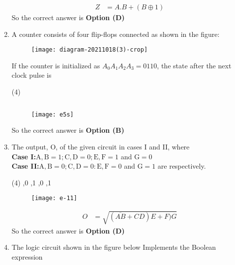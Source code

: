 \begin{enumerate}
\begin{answer}
\begin{align*}
Z&=A . B+(B \oplus 1)
\end{align*}
So the correct answer is \textbf{Option (D)}
\end{answer}
	\item A counter consists of four flip-flops connected as shown in the figure:\\
	\begin{figure}[H]
		\centering
		\texttt{[image: diagram-20211018(3)-crop]}
	\end{figure}
	If the counter is initialized as $A_{0} A_{1} A_{2} A_{3}=0110$, the state after the next clock pulse is
	{}
\begin{tasks}(4)
\end{tasks}
\begin{answer}$\left. \right. $
\begin{figure}[H]
	\centering
	\texttt{[image: e5s]}
\end{figure}
So the correct answer is \textbf{Option (B)}
\end{answer}
	\item The output, $\mathrm{O}$, of the given circuit in cases I and II, where\\
	\textbf{Case I:}\quad $\mathrm{A}, \mathrm{B}=1 ; \mathrm{C}, \mathrm{D}=0 ; \mathrm{E}, \mathrm{F}=1$ and $\mathrm{G}=0$\\
	\textbf{Case II:}\quad $\mathrm{A}, \mathrm{B}=0 ; \mathrm{C}, \mathrm{D}=0: \mathrm{E}, \mathrm{F}=0$ and $\mathrm{G}=1$ are respectively.
	{}
\begin{tasks}(4)
	,0
	,1
	,0
	,1
\end{tasks}
\begin{figure}[H]
	\centering
	\texttt{[image: e-11]}
\end{figure}
\begin{answer}
\begin{align*}
O&=\sqrt{(\overline{A B}+C D) E+F) G}
\end{align*}
So the correct answer is \textbf{Option (D)}
\end{answer}
	\item  The logic circuit shown in the figure below Implements the Boolean expression
	{}
\begin{figure}[H]

\end{figure}
\end{enumerate}
